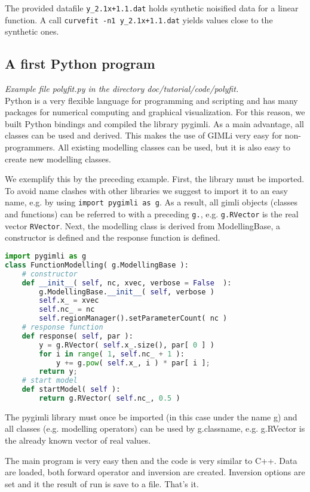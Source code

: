 The provided datafile \verb|y_2.1x+1.1.dat| holds synthetic noisified data for a linear function.
A call \verb|curvefit -n1 y_2.1x+1.1.dat| yields values close to the synthetic ones.

\subsection{A first Python program}
{\em Example file polyfit.py in the directory doc/tutorial/code/polyfit.}\\
Python is a very flexible language for programming and scripting and has many packages for numerical computing and graphical visualization.
For this reason, we built Python bindings and compiled the library pygimli.
As a main advantage, all classes can be used and derived.
This makes the use of GIMLi very easy for non-programmers.
All existing modelling classes can be used, but it is also easy to create new modelling classes.

We exemplify this by the preceding example.
First, the library must be imported.
To avoid name clashes with other libraries we suggest to import it to an easy name, e.g. by using \lstinline|import pygimli as g|.
As a result, all gimli objects (classes and functions) can be referred to with a preceding \lstinline|g.|, e.g. \lstinline|g.RVector| is the real vector \lstinline|RVector|.
Next, the modelling class is derived from ModellingBase, a constructor is defined and the response function is defined.
\begin{lstlisting}[language=python]
import pygimli as g
class FunctionModelling( g.ModellingBase ):
    # constructor
    def __init__( self, nc, xvec, verbose = False  ):
        g.ModellingBase.__init__( self, verbose )
        self.x_ = xvec
        self.nc_ = nc
        self.regionManager().setParameterCount( nc )
    # response function
    def response( self, par ):
        y = g.RVector( self.x_.size(), par[ 0 ] )
        for i in range( 1, self.nc_ + 1 ):
            y += g.pow( self.x_, i ) * par[ i ];
        return y;
    # start model
    def startModel( self ):
        return g.RVector( self.nc_, 0.5 )
\end{lstlisting}

The pygimli library must once be imported (in this case under the name g) and all classes (e.g. modelling operators) can be used by g.classname, e.g. g.RVector is the already known vector of real values.

The main program is very easy then and the code is very similar to C++.
Data are loaded, both forward operator and inversion are created.
Inversion options are set and it the result of run is save to a file.
That's it.

